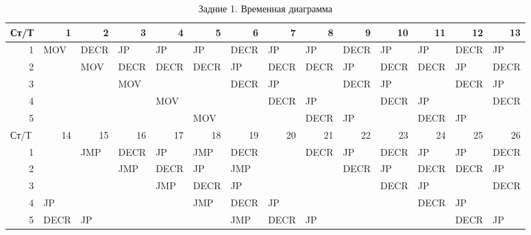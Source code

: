 \documentclass[a4paper,14pt]{extarticle}
\begin{document}
\begin{landscape}

\begin{table}[htbp]
	\small
	\begin{tabular}{|r|l|l||l|l|l|l|l|l|l|l|l|l|l|}
		\hline
		\multicolumn{1}{|l|}{Ст/Т} & \multicolumn{1}{r|}{1} & \multicolumn{1}{r|}{2} & \multicolumn{1}{r|}{3} & \multicolumn{1}{r|}{4} & \multicolumn{1}{r|}{5} & \multicolumn{1}{r|}{6} & \multicolumn{1}{r|}{7} & \multicolumn{1}{r|}{8} & \multicolumn{1}{r|}{9} & \multicolumn{1}{r|}{10} & \multicolumn{1}{r|}{11} & \multicolumn{1}{r|}{12} & \multicolumn{1}{r|}{13} \\ \hline
		1 & MOV & DECR & JP & JP & JP & DECR & JP & JP & DECR & JP & JP & DECR & JP \\ \hline
		2 &  & MOV & DECR & DECR & DECR & JP & DECR & DECR & JP & DECR & DECR & JP & DECR \\ \hline
		3 &  &  & MOV &  &  & DECR & JP &  & DECR & JP &  & DECR & JP \\ \hline
		4 &  &  &  & MOV &  &  & DECR & JP &  & DECR & JP &  & DECR \\ \hline
		5 &  &  &  &  & MOV &  &  & DECR & JP &  & DECR & JP &  \\ \hline\hline
		\multicolumn{1}{|l|}{Ст/Т} & \multicolumn{1}{r|}{14} & \multicolumn{1}{r||}{15} & \multicolumn{1}{r|}{16} & \multicolumn{1}{r|}{17} & \multicolumn{1}{r|}{18} & \multicolumn{1}{r|}{19} & \multicolumn{1}{r|}{20} & \multicolumn{1}{r|}{21} & \multicolumn{1}{r|}{22} & \multicolumn{1}{r|}{23} & \multicolumn{1}{r|}{24} & \multicolumn{1}{r|}{25} & \multicolumn{1}{r|}{26} \\ \hline
		1 &  & JMP & DECR & JP & JMP & DECR &  & DECR & JP & DECR & JP & JP & DECR \\ \hline
		2 &  &  & JMP & DECR & JP & JMP &  &  & DECR & JP & DECR & DECR & JP \\ \hline
		3 &  &  &  & JMP & DECR & JP &  &  &  & DECR & JP &  & DECR \\ \hline
		4 & JP &  &  &  & JMP & DECR & JP &  &  &  & DECR & JP &  \\ \hline
		5 & DECR & JP &  &  &  & JMP & DECR & JP &  &  &  & DECR & JP \\ \hline
	\end{tabular}
	\caption{Задние 1. Временная диаграмма}
	\label{tab:time-1}
\end{table}
\newpage


\end{landscape}
\end{document}
